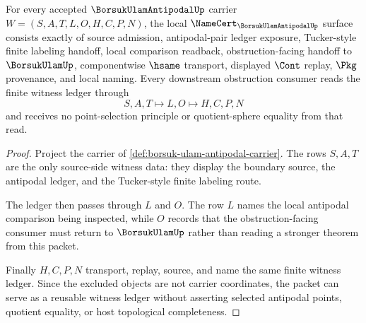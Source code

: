 \begin{theorem}
\label{thm:borsuk-ulam-antipodal-namecert-obligations}
For every accepted $\BorsukUlamAntipodalUp$ carrier $W=(S,A,T,L,O,H,C,P,N)$, the local $\NameCert_{\BorsukUlamAntipodalUp}$ surface consists exactly of source admission, antipodal-pair ledger exposure, Tucker-style finite labeling handoff, local comparison readback, obstruction-facing handoff to $\BorsukUlamUp$, componentwise $\hsame$ transport, displayed $\Cont$ replay, $\Pkg$ provenance, and local naming. Every downstream obstruction consumer reads the finite witness ledger through
$$
S,A,T \longmapsto L,O \longmapsto H,C,P,N
$$
and receives no point-selection principle or quotient-sphere equality from that read.
\end{theorem}
\begin{proof}
Project the carrier of \autoref{def:borsuk-ulam-antipodal-carrier}. The rows $S,A,T$ are the only source-side witness data: they display the boundary source, the antipodal ledger, and the Tucker-style finite labeling route.

The ledger then passes through $L$ and $O$. The row $L$ names the local antipodal comparison being inspected, while $O$ records that the obstruction-facing consumer must return to $\BorsukUlamUp$ rather than reading a stronger theorem from this packet.

Finally $H,C,P,N$ transport, replay, source, and name the same finite witness ledger. Since the excluded objects are not carrier coordinates, the packet can serve as a reusable witness ledger without asserting selected antipodal points, quotient equality, or host topological completeness.
\end{proof}



